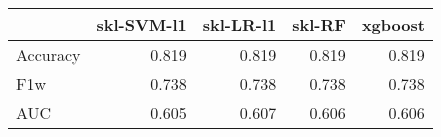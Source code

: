 \begin{tabular}{lrrrr}
\toprule
{} &  skl-SVM-l1 &  skl-LR-l1 &  skl-RF &  xgboost \\
\midrule
Accuracy &       0.819 &      0.819 &   0.819 &    0.819 \\
F1w      &       0.738 &      0.738 &   0.738 &    0.738 \\
AUC      &       0.605 &      0.607 &   0.606 &    0.606 \\
\bottomrule
\end{tabular}
